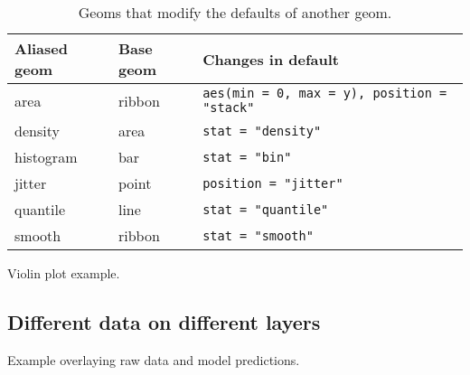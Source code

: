 \begin{table}
  \begin{center}
  \begin{tabular}{lll}
    \toprule
    Aliased geom & Base geom & Changes in default \\
    \midrule
    area      & ribbon & \verb!aes(min = 0, max = y), position = "stack"!  \\
    density   & area   & \verb!stat = "density"!    \\
    histogram & bar    & \verb!stat = "bin"!        \\
    jitter    & point  & \verb!position = "jitter"! \\
    quantile  & line   & \verb!stat = "quantile"!   \\
    smooth    & ribbon & \verb!stat = "smooth"!     \\
    \bottomrule
  \end{tabular}
  \end{center}
  \caption{Geoms that modify the defaults of another geom.}
  \label{label}
\end{table}

Violin plot example.

\subsection{Different data on different layers}
\label{sub:different_data_on_different_layers}

Example overlaying raw data and model predictions.



